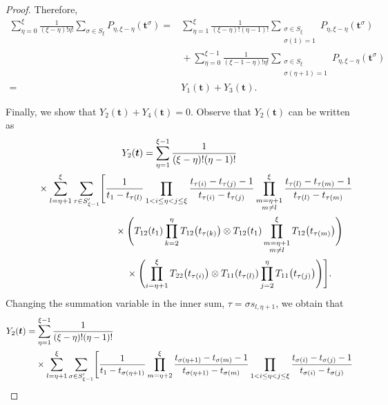 \documentclass[pdftex]{sigma}
\numberwithin{equation}{section}
\begin{document}
\begin{proof}
Therefore,
\begin{align*}
\sum_{\eta=0}^\xi \frac{1}{(\xi-\eta)!\eta!}\sum_{\sigma\in S_\xi} P_{\eta,\xi-\eta}(\boldsymbol{t}^\sigma)={}&\sum_{\eta=1}^\xi \frac{1}{(\xi-\eta)!(\eta-1)!} \sum_{\substack{\sigma\in S_\xi\\\sigma(1)=1}} P_{\eta,\xi-\eta}(\boldsymbol{t}^\sigma) \\
&{}{+} \sum_{\eta=0}^{\xi-1} \frac{1}{(\xi-1-\eta)!\eta!}\sum_{\substack{\sigma\in S_\xi\\\sigma(\eta+1)=1}}P_{\eta,\xi-\eta}(\boldsymbol{t}^\sigma)
\\
={}& Y_1(\boldsymbol{t})+Y_3(\boldsymbol{t}).
\end{align*}

Finally, we show that $Y_2(\boldsymbol{t})+Y_4(\boldsymbol{t})=0$.
Observe that $Y_2(\boldsymbol{t})$ can be written as
\begin{gather*}
Y_2(\boldsymbol{t})= \sum_{\eta=1}^{\xi-1} \frac{1}{(\xi-\eta) ! (\eta-1)!}\\
\hphantom{Y_2(\boldsymbol{t})=}{}
 \times\sum_{l=\eta+1}^\xi \sum_{\tau\in S_{\xi-1}'} \Biggl[ \frac{1}{t_1-t_{\tau(l)}} \prod_{1< i\leq\eta<j \leq \xi} \frac{t_{\tau(i)}-t_{\tau(j)}-1}{t_{\tau(i)}-t_{\tau(j)}} \prod_{\substack{m=\eta+1\\m\neq l}}^\xi \frac{t_{\tau(l)}-t_{\tau(m)}-1}{t_{\tau(l)}-t_{\tau(m)}}\\
\hphantom{Y_2(\boldsymbol{t})=\times\sum_{l=\eta+1}^\xi \sum_{\tau\in S_{\xi-1}'} \Biggl[}{}
\times\Biggl( T_{12} (t_1)\prod_{k=2}^{\eta} T_{12} \bigl(t_{\tau(k)}\bigr) \otimes T_{12}(t_1) \prod_{\substack{m=\eta+1\\m\neq l}}^\xi T_{12} \bigl(t_{\tau(m)}\bigr)\Biggr)\\
\hphantom{Y_2(\boldsymbol{t})=\times\sum_{l=\eta+1}^\xi \sum_{\tau\in S_{\xi-1}'} \Biggl[}{}
\times \Biggl( \prod_{i=\eta+1}^{\xi } T _{22}\bigl(t_{\tau(i)}\bigr)\otimes T_{11}(t_{\tau(l)})\prod_{j=2}^{\eta} T _{11}\bigl(t_{\tau(j)}\bigr)\Biggr) \Biggr].
\end{gather*}
Changing the summation variable in the inner sum, $\tau=\sigma s_{l,\eta+1}$, we obtain that
\begin{gather*}
\begin{split}
&Y_2(\boldsymbol{t})= \sum_{\eta=1}^{\xi-1} \frac{1}{(\xi-\eta) ! (\eta-1)!}\\
&\hphantom{Y_2(\boldsymbol{t})=}{}
 \times\sum_{l=\eta+1}^\xi \sum_{\sigma\in S_{\xi-1}'} \Biggl[ \frac{1}{t_1-t_{\sigma(\eta+1)}} \prod_{m=\eta+2}^\xi \frac{t_{\sigma(\eta+1)}-t_{\sigma(m)}-1}{t_{\sigma(\eta+1)}-t_{\sigma(m)}} \prod_{1< i\leq\eta<j \leq \xi} \frac{t_{\sigma(i)}-t_{\sigma(j)}-1}{t_{\sigma(i)}-t_{\sigma(j)}} \\

\end{split}
\end{gather*}
\end{proof}
\end{document}
